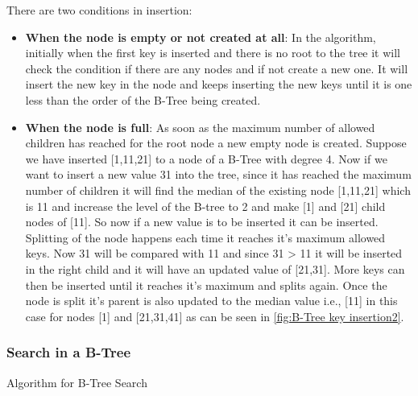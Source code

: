 There are two conditions in insertion:
\begin{itemize}
\item
\textbf{When the node is empty or not created at all}:
In the algorithm, initially when the first key is inserted and there is no root to the tree it will check the condition if there are any nodes and if not create a new one. It will insert the new key in the node and keeps inserting the new keys until it is one less than the order of the B-Tree being created. 
\item
\textbf{When the node is full}:
As soon as the maximum number of allowed children has reached for the root node a new empty node is created. Suppose we have inserted [1,11,21] to a node of a B-Tree with degree 4. Now if we want to insert a new value 31 into the tree, since it has reached the maximum number of children it will find the median of the existing node [1,11,21] which is 11 and increase the level of the B-tree to 2 and make [1] and [21] child nodes of [11]. So now if a new value is to be inserted it can be inserted. Splitting of the node happens each time it reaches it's maximum allowed keys. Now 31 will be compared with 11 and since 31 > 11 it will be inserted in the right child and it will have an updated value of [21,31]. More keys can then be inserted until it reaches it's maximum and splits again. Once the node is split it's parent is also updated to the median value i.e., [11] in this case for nodes [1] and [21,31,41] as can be seen in \ref{fig:B-Tree key insertion2}.
\end{itemize}

\subsubsection{Search in a B-Tree}

\begin{algorithm}[H]
    \SetAlgoLined
     \caption{Algorithm for B-Tree Search}
     \label{B-Tree Search}
\end{algorithm}

